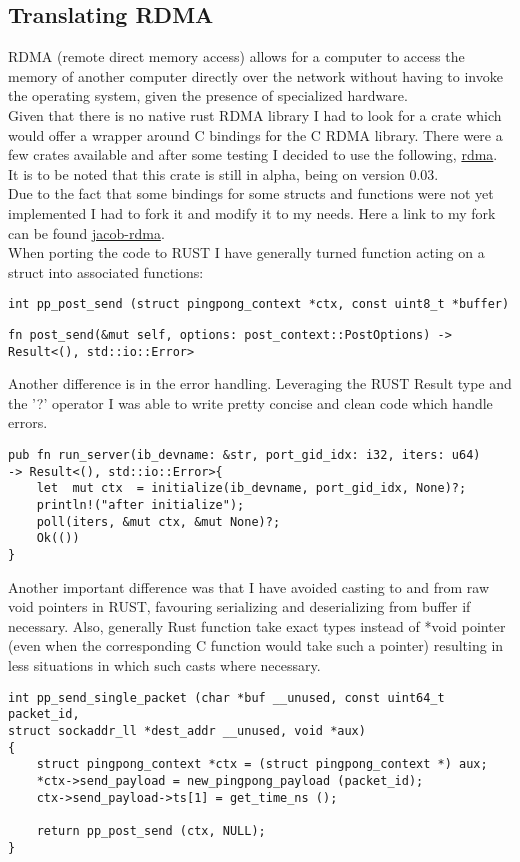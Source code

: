 \documentclass{article}
\begin{document}
\subsection*{Translating RDMA}
RDMA (remote direct memory access) allows for a computer to access the memory of another computer directly over the network without having to invoke the operating system, given the presence of specialized hardware.\\
Given that there is no native rust RDMA library I had to look for a crate which would offer a wrapper around C bindings for the C RDMA library. There were a few crates available and after some testing I decided to use the following, \href{https://github.com/Nugine/rdma}{rdma}. It is to be noted that this crate is still in alpha, being on version 0.03.\\
Due to the fact that some bindings for some structs and functions were not yet implemented I had to fork it and modify it to my needs. Here a link to my fork can be found \href{https://github.com/JacobSalvi/rdma}{jacob-rdma}.\\
When porting the code to RUST I have generally turned function acting on a struct into associated functions:
\begin{verbatim}
int pp_post_send (struct pingpong_context *ctx, const uint8_t *buffer)
\end{verbatim}
\begin{verbatim}
fn post_send(&mut self, options: post_context::PostOptions) -> Result<(), std::io::Error>
\end{verbatim}
Another difference is in the error handling. Leveraging the RUST Result type and the '?' operator I was able to write pretty concise and clean code which handle errors.
\begin{verbatim}
pub fn run_server(ib_devname: &str, port_gid_idx: i32, iters: u64)
-> Result<(), std::io::Error>{
    let  mut ctx  = initialize(ib_devname, port_gid_idx, None)?;
    println!("after initialize");
    poll(iters, &mut ctx, &mut None)?;
    Ok(())
}
\end{verbatim}

Another important difference was that I have avoided casting to and from raw void pointers in RUST, favouring serializing and deserializing from buffer if necessary. Also, generally Rust function take exact types instead of *void pointer (even when the corresponding C function would take such a pointer) resulting in less situations in which such casts where necessary.

\begin{verbatim}
int pp_send_single_packet (char *buf __unused, const uint64_t packet_id,
struct sockaddr_ll *dest_addr __unused, void *aux)
{
    struct pingpong_context *ctx = (struct pingpong_context *) aux;
    *ctx->send_payload = new_pingpong_payload (packet_id);
    ctx->send_payload->ts[1] = get_time_ns ();

    return pp_post_send (ctx, NULL);
}
\end{verbatim}
\end{document}
